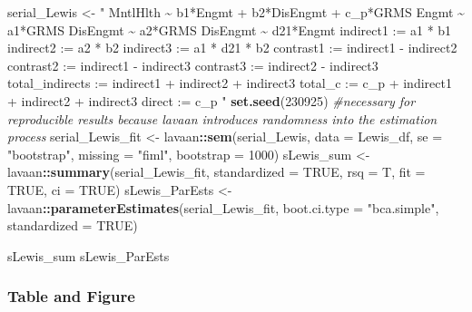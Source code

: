 \documentclass[
  11pt,
]{book}
\newenvironment{Shaded}{\begin{snugshade}}{\end{snugshade}}
\newcommand{\AttributeTok}[1]{\textcolor[rgb]{0.27,0.27,0.27}{#1}}
\newcommand{\CommentTok}[1]{\textcolor[rgb]{0.37,0.37,0.37}{\textit{#1}}}
\newcommand{\ConstantTok}[1]{\textcolor[rgb]{0.37,0.37,0.37}{#1}}
\newcommand{\DecValTok}[1]{\textcolor[rgb]{0.06,0.06,0.06}{#1}}
\newcommand{\FunctionTok}[1]{\textcolor[rgb]{0.27,0.27,0.27}{\textbf{#1}}}
\newcommand{\NormalTok}[1]{#1}
\newcommand{\OtherTok}[1]{\textcolor[rgb]{0.37,0.37,0.37}{#1}}
\newcommand{\SpecialCharTok}[1]{\textcolor[rgb]{0.43,0.43,0.43}{\textbf{#1}}}
\newcommand{\StringTok}[1]{\textcolor[rgb]{0.5,0.5,0.5}{#1}}
\begin{document}
\begin{Shaded}
\begin{Highlighting}[]
\NormalTok{serial\_Lewis }\OtherTok{\textless{}{-}} \StringTok{"}
\StringTok{    MntlHlth \textasciitilde{} b1*Engmt + b2*DisEngmt + c\_p*GRMS}
\StringTok{    Engmt \textasciitilde{} a1*GRMS    }
\StringTok{    DisEngmt \textasciitilde{} a2*GRMS}
\StringTok{    DisEngmt \textasciitilde{} d21*Engmt}
\StringTok{    }
\StringTok{    indirect1 := a1 * b1}
\StringTok{    indirect2 := a2 * b2}
\StringTok{    indirect3 := a1 * d21 * b2}
\StringTok{    contrast1 := indirect1 {-} indirect2}
\StringTok{    contrast2 := indirect1 {-} indirect3}
\StringTok{    contrast3 := indirect2 {-} indirect3}
\StringTok{    total\_indirects := indirect1 + indirect2 + indirect3}
\StringTok{    total\_c := c\_p + indirect1 + indirect2 + indirect3}
\StringTok{    direct := c\_p}
\StringTok{"}
\FunctionTok{set.seed}\NormalTok{(}\DecValTok{230925}\NormalTok{)  }\CommentTok{\#necessary for reproducible results because lavaan introduces randomness into the estimation process}
\NormalTok{serial\_Lewis\_fit }\OtherTok{\textless{}{-}}\NormalTok{ lavaan}\SpecialCharTok{::}\FunctionTok{sem}\NormalTok{(serial\_Lewis, }\AttributeTok{data =}\NormalTok{ Lewis\_df, }\AttributeTok{se =} \StringTok{"bootstrap"}\NormalTok{,}
    \AttributeTok{missing =} \StringTok{"fiml"}\NormalTok{, }\AttributeTok{bootstrap =} \DecValTok{1000}\NormalTok{)}
\NormalTok{sLewis\_sum }\OtherTok{\textless{}{-}}\NormalTok{ lavaan}\SpecialCharTok{::}\FunctionTok{summary}\NormalTok{(serial\_Lewis\_fit, }\AttributeTok{standardized =} \ConstantTok{TRUE}\NormalTok{, }\AttributeTok{rsq =}\NormalTok{ T,}
    \AttributeTok{fit =} \ConstantTok{TRUE}\NormalTok{, }\AttributeTok{ci =} \ConstantTok{TRUE}\NormalTok{)}
\NormalTok{sLewis\_ParEsts }\OtherTok{\textless{}{-}}\NormalTok{ lavaan}\SpecialCharTok{::}\FunctionTok{parameterEstimates}\NormalTok{(serial\_Lewis\_fit, }\AttributeTok{boot.ci.type =} \StringTok{"bca.simple"}\NormalTok{,}
    \AttributeTok{standardized =} \ConstantTok{TRUE}\NormalTok{)}

\NormalTok{sLewis\_sum}
\NormalTok{sLewis\_ParEsts}
\end{Highlighting}
\end{Shaded}

\hypertarget{table-and-figure-1}{%
\subsubsection{Table and Figure}\label{table-and-figure-1}}
\end{document}

